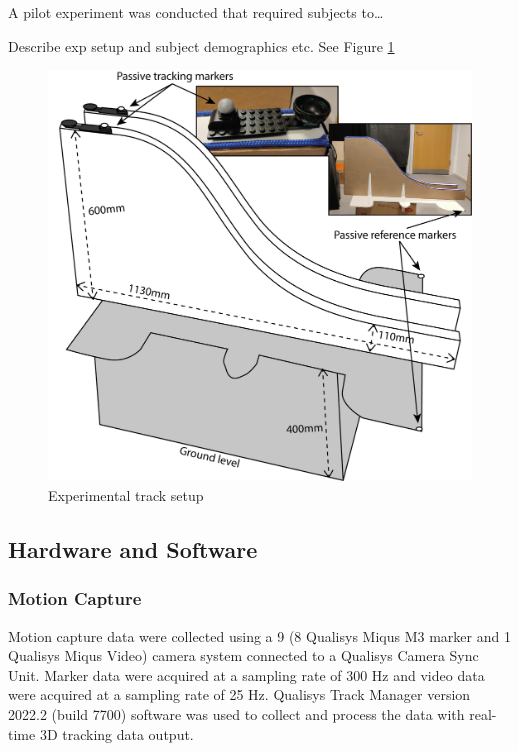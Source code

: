 \documentclass[10pt,a4paper,onecolumn]{article}
\begin{document}
A pilot experiment was conducted that required subjects to\ldots{}

Describe exp setup and subject demographics etc. See Figure \ref{fig:track-setup}

\begin{figure}

{\centering \includegraphics[width=1\linewidth]{figures/track_dimensions} 

}

\caption{Experimental track setup}\label{fig:track-setup}
\end{figure}

\hypertarget{hardware-and-software}{%
\subsection{Hardware and Software}\label{hardware-and-software}}

\hypertarget{motion-capture}{%
\subsubsection{Motion Capture}\label{motion-capture}}

Motion capture data were collected using a 9 (8 Qualisys Miqus M3 marker and 1 Qualisys Miqus Video) camera system connected to a Qualisys Camera Sync Unit.
Marker data were acquired at a sampling rate of 300 Hz and video data were acquired at a sampling rate of 25 Hz. Qualisys Track Manager version 2022.2 (build 7700) software was used to collect and process the data with real-time 3D tracking data output.
\end{document}
